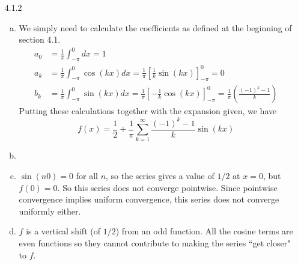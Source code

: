 \documentclass[../../Solutions.tex]{subfiles}
\begin{document}
\begin{itemize}


	\item [4.1.2]
	\begin{enumerate}[(a)]
		\item We simply need to calculate the coefficients as defined at the beginning of section 4.1.
			\begin{equation*} \begin{split} 
				a_0 &= \frac{1}{\pi} \int_{-\pi}^{0} dx = 1 \\
				a_k &= \frac{1}{\pi} \int_{-\pi}^{0} \cos(kx) dx = \frac{1}{\pi}\left[\frac{1}{k}\sin(kx)\right]_{-\pi}^{0} = 0 \\
				b_k &= \frac{1}{\pi} \int_{-\pi}^{0} \sin(kx) dx = \frac{1}{\pi}\left[-\frac{1}{k}\cos(kx)\right]_{-\pi}^{0} = \frac{1}{\pi}\left(\frac{(-1)^k-1}{k}\right)
			\end{split} \end{equation*}
			Putting these calculations together with the expansion given, we have
			\begin{equation*}
				f(x) = \frac{1}{2}+\frac{1}{\pi}\sum_{k=1}^\infty \frac{(-1)^k-1}{k} \sin(kx)
			\end{equation*}
		\item %
		\item $\sin(n0) = 0$ for all $n$, so the series gives a value of $1/2$ at $x = 0$, but $f(0)=0$. So this series does not converge pointwise.
			Since pointwise convergence implies uniform convergence, this series does not converge uniformly either.
		\item $f$ is a vertical shift (of $1/2$) from an odd function.
			All the cosine terms are even functions so they cannot contribute to making the series ``get closer" to $f$.
	\end{enumerate}
	

\end{itemize}
\end{document}
